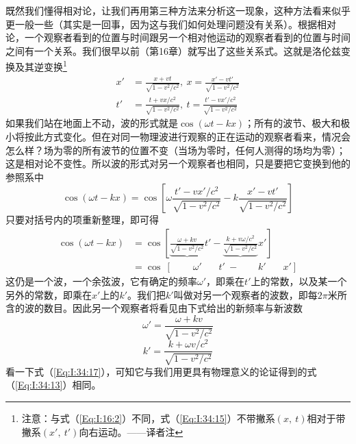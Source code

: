 既然我们懂得相对论，让我们再用第三种方法来分析这一现象，这种方法看来似乎更一般一些（其实是一回事，因为这与我们如何处理问题没有关系）。根据相对论，一个观察者看到的位置与时间跟另一个相对他运动的观察者看到的位置与时间之间有一个关系。我们很早以前（第16章）就写出了这些关系式。这就是洛伦兹变换及其逆变换\footnote{注意：与式（\ref{Eq:I:16:2}）不同，式（\ref{Eq:I:34:15}）不带撇系$(x,~t)$相对于带撇系$(x',~t')$向右运动。——译者注}
\begin{equation}
    \label{Eq:I:34:15}
    \begin{aligned}
        x' &= \frac{x+vt}{\sqrt{1-v^2/c^2}},~x = \frac{x'-vt'}{\sqrt{1-v^2/c^2}} \\
        t' &= \frac{t+vx/c^2}{\sqrt{1-v^2/c^2}},~t = \frac{t'-vx'/c^2}{\sqrt{1-v^2/c^2}} 
    \end{aligned}
\end{equation}
如果我们站在地面上不动，波的形式就是$\cos(\omega t-kx)$；所有的波节、极大和极小将按此方式变化。但在对同一物理波进行观察的正在运动的观察者看来，情况会怎么样？场为零的所有波节的位置不变（当场为零时，任何人测得的场均为零）；这是相对论不变性。所以波的形式对另一个观察者也相同，只是要把它变换到他的参照系中
\begin{equation*}
    \cos(\omega t - kx) = \cos \left [ \omega\frac{t'-vx'/c^2}{\sqrt{1-v^2/c^2}} - k\frac{x'-vt'}{\sqrt{1-v^2/c^2}} \right ]
\end{equation*}
只要对括号内的项重新整理，即可得
\begin{equation}
    \label{Eq:I:34:16}
    \begin{aligned}
        \cos(\omega t - kx) &= \cos \left [ \underbrace{\frac{\omega + kv}{\sqrt{1-v^2/c^2}}}t' - \underbrace{\frac{k + v\omega /c^2}{\sqrt{1-v^2/c^2}}}x' \right ] \\
        &=\cos~[~~~~~~~~~~\omega'~~~~~~~~ t' ~-~~~~~~~~~ k' ~~~~~~~~x']
    \end{aligned}
\end{equation}
这仍是一个波，一个余弦波，它有确定的频率$\omega'$，即乘在$t'$上的常数，以及某一个另外的常数，即乘在$x'$上的$k'$。我们把$k'$叫做对另一个观察者的波数，即每$2\pi$米所含的波的数目。因此另一个观察者将看见由下式给出的新频率与新波数
\begin{equation}
    \label{Eq:I:34:17}
    \omega' = \frac{\omega + kv}{\sqrt{1-v^2/c^2}}
\end{equation}
\begin{equation}
    \label{Eq:I:34:18}
    k' = \frac{k + \omega v/c^2}{\sqrt{1-v^2/c^2}}
\end{equation}
看一下式（\ref{Eq:I:34:17}），可知它与我们用更具有物理意义的论证得到的式（\ref{Eq:I:34:13}）相同。

